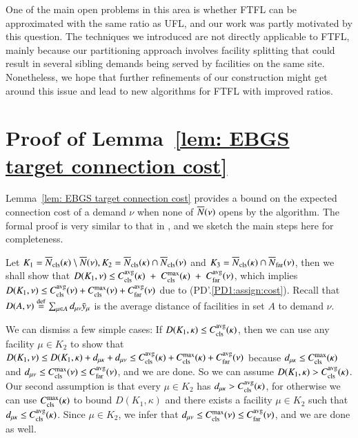 \documentclass[preprint,12pt]{elsarticle}
\begin{document}
One of the main open problems in this area is whether FTFL can be approximated with the
same ratio as UFL, and our work was partly motivated by this question. The techniques we
introduced are not directly applicable to FTFL, mainly because our partitioning
approach involves facility splitting that could result in several sibling demands being served
by facilities on the same site. Nonetheless, we hope that further refinements of 
our construction might get around this issue and
lead to new algorithms for FTFL with improved ratios.
\pagebreak




\pagebreak

\appendix
\section{Proof of Lemma~\ref{lem: EBGS target connection cost}}
  Lemma~\ref{lem: EBGS target connection cost} provides a bound on the
  expected connection cost of a demand $\nu$ when none of
  ${\overline{N}}(\nu)$ opens by the algorithm. The formal proof is very
  similar to that in \cite{ByrkaA10}, and we sketch the main steps
  here for completeness.

  Let $K_1 = {\overline{N}}_{{\mbox{\scriptsize\rm cls}}}(\kappa) \setminus {\overline{N}}(\nu), K_2 =
  {\overline{N}}_{{\mbox{\scriptsize\rm cls}}}(\kappa) \cap {\overline{N}}_{{\mbox{\scriptsize\rm cls}}}(\nu)$ and $K_3 =
  {\overline{N}}_{{\mbox{\scriptsize\rm cls}}}(\kappa) \cap {\overline{N}}_{{\mbox{\scriptsize\rm far}}}(\nu)$, then we shall show that
  $D(K_1, \nu) \leq C_{{\mbox{\scriptsize\rm cls}}}^{{\mbox{\scriptsize\rm avg}}}(\kappa)\;+\;C_{{\mbox{\scriptsize\rm cls}}}^{\max}(\kappa)\; + \;
  C_{{\mbox{\scriptsize\rm far}}}^{{\mbox{\scriptsize\rm avg}}}(\nu)$, which implies $D(K_1, \nu) \leq C_{{\mbox{\scriptsize\rm cls}}}^{{\mbox{\scriptsize\rm avg}}}(\nu) +
  C_{{\mbox{\scriptsize\rm cls}}}^{\max}(\nu) + C_{{\mbox{\scriptsize\rm far}}}^{{\mbox{\scriptsize\rm avg}}}(\nu)$ due to
  (PD'.\ref{PD1:assign:cost}). Recall that $D(A,\nu)
  \stackrel{\mathrm{def}}{=} \sum_{\mu\in A} d_{\mu\nu}{\bar y}_{\mu}$ is
  the average distance of facilities in set $A$ to demand $\nu$.

  We can dismiss a few simple cases: If $D(K_1, \kappa) \leq
  C_{{\mbox{\scriptsize\rm cls}}}^{{\mbox{\scriptsize\rm avg}}}(\kappa)$, then we can use any facility $\mu \in K_2$ to
  show that $D(K_1,\nu) \leq D(K_1, \kappa) + d_{\mu\kappa} +
  d_{\mu\nu} \leq C_{{\mbox{\scriptsize\rm cls}}}^{{\mbox{\scriptsize\rm avg}}}(\kappa) + C_{{\mbox{\scriptsize\rm cls}}}^{\max}(\kappa) + C_{{\mbox{\scriptsize\rm far}}}^{{\mbox{\scriptsize\rm avg}}}(\nu)$
  because $d_{\mu\kappa} \leq C_{{\mbox{\scriptsize\rm cls}}}^{\max}(\kappa)$ and $d_{\mu\nu} \leq
  C_{{\mbox{\scriptsize\rm cls}}}^{\max}(\nu) \leq C_{{\mbox{\scriptsize\rm far}}}^{{\mbox{\scriptsize\rm avg}}}(\nu)$, and we are done. So we can assume
  $D(K_1, \kappa) > C_{{\mbox{\scriptsize\rm cls}}}^{{\mbox{\scriptsize\rm avg}}}(\kappa)$. Our second assumption is that
  every $\mu \in K_2$ has $d_{\mu\kappa} > C_{{\mbox{\scriptsize\rm cls}}}^{{\mbox{\scriptsize\rm avg}}}(\kappa)$, for
  otherwise we can use $C_{{\mbox{\scriptsize\rm cls}}}^{\max}(\kappa)$ to bound $D(K_1, \kappa)$ and
  there exists a facility $\mu\in K_2$ such that $d_{\mu\kappa} \leq
  C_{{\mbox{\scriptsize\rm cls}}}^{{\mbox{\scriptsize\rm avg}}}(\kappa)$. Since $\mu\in K_2$, we infer that $d_{\mu\nu}
  \leq C_{{\mbox{\scriptsize\rm cls}}}^{\max}(\nu) \leq C_{{\mbox{\scriptsize\rm far}}}^{{\mbox{\scriptsize\rm avg}}}(\nu)$, and we are done as well.
\end{document}
